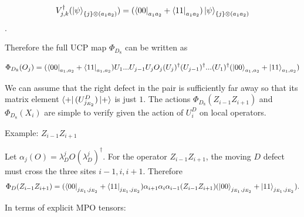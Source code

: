 \documentclass{article}
\theoremstyle{definition}
\begin{document}
\begin{equation}
V^\dagger_{j,k}(\ket{\psi}_{\{j\}\otimes(a_1a_2)}) =  (\bra{00}_{a_1a_2} + \bra{11}_{a_1a_2})\ket{\psi}_{\{j\}\otimes(a_1a_2)}
\end{equation}
.

Therefore the full UCP map $\Phi_{D_8}$ can be written as

\begin{equation}
    \Phi_{D_8}(O_j) = (\bra{00}_{a_1,a_2} + \bra{11}_{a_1,a_2}) U_1 ... U_{j-1} U_j O_j (U_j)^\dagger (U_{j-1})^\dagger ... (U_{1})^\dagger (\ket{00}_{a_1,a_2} + \ket{11}_{a_1,a_2})
\end{equation}






We can assume that the right defect in the pair is sufficiently far away so that its matrix element $\bra{+}(U^D_{j_{E_2}})\ket{+}$ is just $1$.  The actions  $\Phi_{D_8}(Z_{i-1}Z_{i+1})$ and  $\Phi_{D_8}(X_i)$ are simple to verify given the action of $U^D_i$ on local operators. 


\color{blue}
Example: $Z_{i-1}Z_{i+1}$

Let \(\alpha_j(O)=\lambda_D^jO(\lambda_D^j)^\dagger\).  For the
operator \(Z_{i-1}Z_{i+1}\), the moving \(D\) defect must cross the
three sites \(i-1,i,i+1\).  Therefore
\[
    \Phi_D(Z_{i-1}Z_{i+1})
    =
    (\bra{00}_{j_{E_1},j_{E_2}} + \bra{11}_{j_{E_1},j_{E_2}})
    \alpha_{i+1}\alpha_i\alpha_{i-1}
    (Z_{i-1}Z_{i+1})
    (\ket{00}_{j_{E_1},j_{E_2}} + \ket{11}_{j_{E_1},j_{E_2}}).
\]


In terms of explicit MPO tensors:
\end{document}
